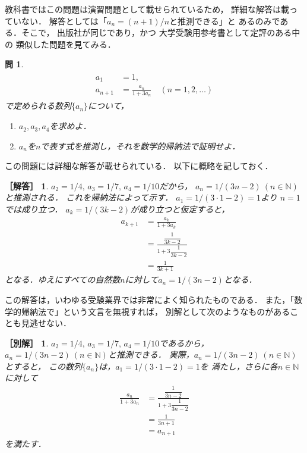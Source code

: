 \documentclass[11pt,a4paper]{ltjsarticle} %
\theoremstyle{mystyle} %
\newtheorem{que}{問} %
\newtheorem*{ans}{［解答］} %
\newtheorem*{ans2}{［別解］} %
\begin{document}
教科書ではこの問題は演習問題として載せられているため，
詳細な解答は載っていない．
解答としては「$a_n=(n+1)/n$と推測できる」と
あるのみである．そこで，
出版社が同じであり，かつ
大学受験用参考書として定評のある\cite{chert}中の
類似した問題を見てみる．
\begin{que} \label{que:suisokuchert}
  \begin{align}
    \begin{aligned}
      a_1 & = 1, \\
      a_{n+1} & = \frac{a_n}{1 + 3 a_n} \quad ( n = 1,2,\ldots )
    \end{aligned}
    \label{eq:zenkasiki}
  \end{align}
  で定められる数列$\{ a_n \}$について，
  \begin{enumerate}
    \item $a_2,a_3,a_4$を求めよ．
    \item $a_n$を$n$で表す式を推測し，それを数学的帰納法で証明せよ．
  \end{enumerate}
\end{que}

この問題には詳細な解答が載せられている．
以下に概略を記しておく．

\begin{ans}
  $a_2=1/4, \, a_3 = 1/7 , \, a_4 = 1/10$だから，
  $a_n = 1/(3n-2) \ (n \in \mathbb{N})$と推測される．
  これを帰納法によって示す．
  $a_1=1/(3 \cdot 1 -2) = 1$より
  $n=1$では成り立つ．
  $a_k= 1/(3k-2)$が成り立つと仮定すると，
  \begin{align*}
    a_{k+1} & = \frac{a_k}{1+3a_k} \\
            & = \frac{ \dfrac{1}{3k-2} }{ 1 + 3 \dfrac{1}{3k-2} } \\
            & = \frac{1}{3k+1}
  \end{align*}
  となる．ゆえにすべての自然数$n$に対して$a_n=1/(3n-2)$となる．
\end{ans}

この解答は，いわゆる受験業界では非常によく知られたものである．
また，「数学的帰納法で」という文言を無視すれば，
別解として次のようなものがあることも見逃せない．

\begin{ans2}
  $a_2 = 1/4 , \, a_3 = 1/7 , \, a_4 = 1/10$であるから，
  $a_n = 1/(3n-2) \ (n \in \mathbb{N})$と推測できる．
  実際，$a_n = 1/(3n-2) \ (n \in \mathbb{N})$とすると，
  この数列$\{ a_n \}$は，$a_1 = 1/(3 \cdot 1-2)=1$を
  満たし，さらに各$n \in \mathbb{N}$に対して
  \begin{align*}
    \frac{a_n}{1+ 3 a_n} & = 
    \frac{ \dfrac{1}{3n-2} }{ 1+ 3 \dfrac{1}{3n-2} } \\
    & = \frac{1}{3n+1} \\
    & = a_{n+1}
  \end{align*}
  を満たす．
\end{ans2}
\end{document}

